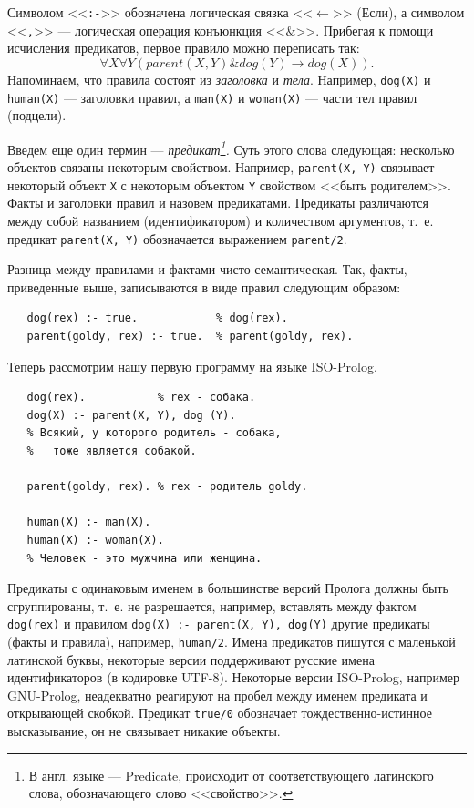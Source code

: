 \documentclass[12pt, openany, twoside]{book} %
\begin{document}
\noindent Символом <<{\tt :-}>> обозначена логическая связка <<$\leftarrow$>> (Если), а символом <<{\tt ,}>> --- логическая операция конъюнкция <<$\&$>>. Прибегая к помощи исчисления предикатов, первое правило можно переписать так:
$$
    \forall X \forall Y (parent(X, Y) \& dog(Y) \to dog(X)).
$$
Напоминаем, что правила состоят из {\em заголовка} и {\em тела}. Например, {\tt dog(X)} и {\tt human(X)} --- заголовки правил, а {\tt man(X)} и {\tt woman(X)} --- части тел правил (подцели).

Введем еще один термин --- {\em предикат\footnote{В англ. языке --- Predicate, происходит от соответствующего латинского слова, обозначающего слово <<свойство>>.}.} Суть этого слова следующая: несколько объектов связаны некоторым свойством. Например, {\tt parent(X, Y)} связывает некоторый объект {\tt X} с некоторым объектом {\tt Y} свойством <<быть родителем>>. Факты и заголовки правил и назовем предикатами. Предикаты различаются между собой названием (идентификатором) и количеством аргументов, т.~е. предикат {\tt parent(X, Y)} обозначается выражением {\tt parent/2}.

Разница между правилами и фактами чисто семантическая. Так, факты, приведенные выше, записываются в виде правил следующим образом:
{\tt\begin{verbatim}
   dog(rex) :- true.            % dog(rex).
   parent(goldy, rex) :- true.  % parent(goldy, rex).
\end{verbatim}}

Теперь рассмотрим нашу первую программу на языке ISO-Prolog.
{\tt\begin{verbatim}
   dog(rex).           % rex - собака.
   dog(X) :- parent(X, Y), dog (Y).
   % Всякий, у которого родитель - собака,
   %   тоже является собакой.

   parent(goldy, rex). % rex - родитель goldy.

   human(Х) :- man(Х).
   human(Х) :- woman(Х).
   % Человек - это мужчина или женщина.
\end{verbatim}}
Предикаты с одинаковым именем в большинстве версий Пролога должны быть сгруппированы, т.~е. не разрешается, например, вставлять между фактом {\tt dog(rex)} и правилом {\tt dog(X) :- parent(X, Y), dog(Y)} другие предикаты (факты и правила), например, {\tt human/2}. Имена предикатов пишутся с маленькой латинской буквы, некоторые версии поддерживают русские имена идентификаторов (в кодировке UTF-8). Некоторые версии ISO-Prolog, например GNU-Prolog, неадекватно реагируют на пробел между именем предиката и открывающей скобкой.  Предикат {\tt true/0} обозначает тождественно-истинное высказывание, он не связывает никакие объекты.
\end{document}
